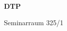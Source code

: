 \documentclass[a4paper]{article}
\begin{document}
\printGenericVSLHeader
\begin{center}
\begin{vsltext}{3cm}{4cm}

   \vspace{0.5cm} 

    \textbf{DTP} 

    \vspace{1.5cm}

    Seminarraum 325/1

\end{vsltext}

\end{center}
\end{document}
